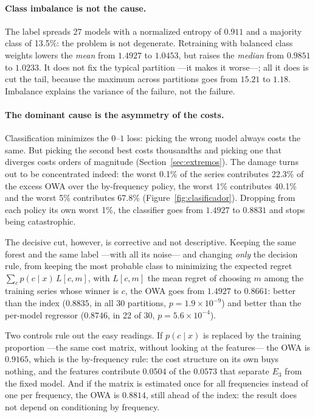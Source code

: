 \paragraph{Class imbalance is not the cause.} The label spreads 27 models with a
normalized entropy of $0.911$ and a majority class of 13.5\%: the problem is not
degenerate. Retraining with balanced class weights lowers the \emph{mean} from $1.4927$
to $1.0453$, but raises the \emph{median} from $0.9851$ to $1.0233$. It does not fix the
typical partition ---it makes it worse---; all it does is cut the tail, because the
maximum across partitions goes from $15.21$ to $1.18$. Imbalance explains the variance
of the failure, not the failure.

\paragraph{The dominant cause is the asymmetry of the costs.} Classification minimizes
the $0$--$1$ loss: picking the wrong model always costs the same. But picking the second
best costs thousandths and picking one that diverges costs orders of magnitude
(Section~\ref{sec:extremos}). The damage turns out to be concentrated indeed: the worst
0.1\% of the series contributes 22.3\% of the excess OWA over the by-frequency policy,
the worst 1\% contributes 40.1\% and the worst 5\% contributes 67.8\%
(Figure~\ref{fig:clasificador}). Dropping from each policy its own worst 1\%, the
classifier goes from $1.4927$ to $0.8831$ and stops being catastrophic.

The decisive cut, however, is corrective and not descriptive. Keeping the same forest
and the same label ---with all its noise--- and changing \emph{only} the decision rule,
from keeping the most probable class to minimizing the expected regret
$\sum_c p(c\mid x)\,L[c,m]$, with $L[c,m]$ the mean regret of choosing $m$ among the
training series whose winner is $c$, the OWA goes from $1.4927$ to $\mathbf{0.8661}$:
better than the index ($0.8835$, in all 30 partitions, $p=1.9\times10^{-9}$) and better
than the per-model regressor ($0.8746$, in 22 of 30, $p=5.6\times10^{-4}$).

Two controls rule out the easy readings. If $p(c\mid x)$ is replaced by the training
proportion ---the same cost matrix, without looking at the features--- the OWA is
$0.9165$, which is the by-frequency rule: the cost structure on its own buys nothing,
and the features contribute $0.0504$ of the $0.0573$ that separate $E_3$ from the fixed
model. And if the matrix is estimated once for all frequencies instead of one per
frequency, the OWA is $0.8814$, still ahead of the index: the result does not depend on
conditioning by frequency.

